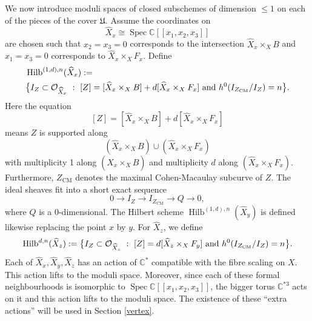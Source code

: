 \documentclass{amsart}
\theoremstyle{definition}
\newcommand{\CC} {\mathbb{C}}          %
\renewcommand{\O}{\mathcal{O}}
\newcommand{\Hilb}{\operatorname{Hilb}}
\newcommand{\CM}{\operatorname{CM}}
\newcommand{\Spec}{\operatorname{Spec}}
\begin{document}
We now introduce moduli spaces of closed subschemes of dimension $\leq 1$ on each of the pieces of the cover $\mathfrak{U}$. Assume the coordinates on $$\widehat{X}_x \cong \Spec \CC[\![ x_1,x_2,x_3]\!]$$ are chosen such that $x_2=x_3=0$ corresponds to the intersection $\widehat{X}_x \times_X B$ and $x_1=x_3=0$ corresponds to $\widehat{X}_x \times_X F_x$. Define
\begin{align*}
&\Hilb^{(1,d),n}(\widehat{X}_x) := \\
&\big\{ I_Z \subset \O_{\widehat{X}_x} \ : \ [Z] = [\widehat{X}_x \times_X B] + d [\widehat{X}_x \times_X F_x] \ {\rm{and}} \ h^0(I_{Z_{\CM}} / I_Z) = n \big\}.
\end{align*}
Here the equation
$$
[Z] = [\widehat{X}_x \times_X B] + d [\widehat{X}_x \times_X F_x]
$$
means $Z$ is supported along $$(\widehat{X}_x \times_X B) \cup (\widehat{X}_x \times_X F_x)$$ with multiplicity 1 along $(\widehat{X}_x \times_X B)$ and multiplicity $d$ along $(\widehat{X}_x \times_X F_x)$. Furthermore, $Z_{\CM}$ denotes the maximal Cohen-Macaulay subcurve of $Z$. The ideal sheaves fit into a short exact sequence
$$
0 \longrightarrow I_{Z} \longrightarrow I_{Z_{\CM}} \longrightarrow Q \longrightarrow 0, 
$$
where $Q$ is a 0-dimensional. The Hilbert scheme $\Hilb^{(1,d),n}(\widehat{X}_y)$ is defined likewise replacing the point $x$ by $y$. For $\widehat{X}_z$, we define
$$
\Hilb^{d,n}(\widehat{X}_z) := \big\{ I_Z \subset \O_{\widehat{X}_z} \ : \ [Z] = d [\widehat{X}_z \times_X F_y] \ {\rm{and}} \ h^0(I_{Z_{\CM}} / I_Z) = n \big\}.
$$
Each of $\widehat{X}_x, \widehat{X}_y, \widehat{X}_z$ has an action of $\CC^*$ compatible with the fibre scaling on $X$. This action lifts to the moduli space. Moreover, since each of these formal neighbourhoods is isomorphic to $\Spec \CC[\![x_1,x_2,x_3]\!]$, the bigger torus $\CC^{*3}$ acts on it and this action lifts to the moduli space. The existence of these ``extra actions'' will be used in Section \ref{vertex}.
\end{document}
